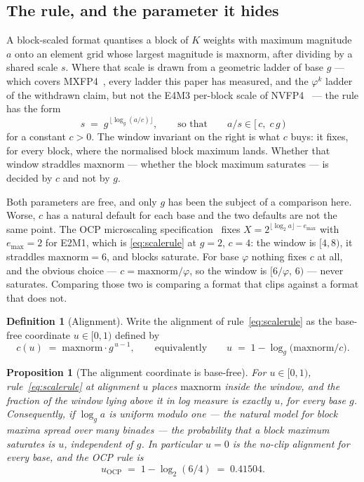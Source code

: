 \documentclass[11pt]{article}
\newtheorem{proposition}[theorem]{Proposition}
\theoremstyle{definition}
\newtheorem{definition}{Definition}
\begin{document}
\subsection{The rule, and the parameter it hides}
\label{sec:twoknobs}

A block-scaled format quantises a block of $K$ weights with maximum magnitude
$a$ onto an element grid whose largest magnitude is $\mathrm{maxnorm}$, after
dividing by a shared scale $s$. Where that scale is drawn from a geometric
ladder of base $g$ --- which covers MXFP4~\cite{ocpmx}, every ladder this paper
has measured, and the $\varphi^{k}$ ladder of the withdrawn claim, but not the
E4M3 per-block scale of NVFP4~\cite{nvfp4} --- the rule has the form
\begin{equation}
  s \;=\; g^{\,\lfloor \log_g (a/c)\rfloor},
  \qquad\text{so that}\qquad
  a/s \in [\,c,\; c\,g\,)
\end{equation}
for a constant $c>0$. The window invariant on the right is what $c$ buys: it
fixes, for every block, where the normalised block maximum lands. Whether that
window straddles $\mathrm{maxnorm}$ --- whether the block maximum saturates ---
is decided by $c$ and not by $g$.

Both parameters are free, and only $g$ has been the subject of a comparison
here. Worse, $c$ has a natural default for each base and the two defaults are
not the same point. The OCP microscaling specification~\cite{ocpmx} fixes
$X = 2^{\lfloor \log_2 a\rfloor - e_{\max}}$ with $e_{\max}=2$ for E2M1, which
is \eqref{eq:scalerule} at $g=2$, $c=4$: the window is $[4,8)$, it straddles
$\mathrm{maxnorm}=6$, and blocks saturate. For base $\varphi$ nothing fixes $c$
at all, and the obvious choice --- $c=\mathrm{maxnorm}/\varphi$, so the window
is $[6/\varphi,\,6)$ --- never saturates. Comparing those two is comparing a
format that clips against a format that does not.

\begin{definition}[Alignment]
\label{def:align}
Write the alignment of rule~\eqref{eq:scalerule} as the base-free coordinate
$u\in[0,1)$ defined by
\[
  c(u) \;=\; \mathrm{maxnorm}\cdot g^{\,u-1},
  \qquad\text{equivalently}\qquad
  u \;=\; 1 - \log_g\!\bigl(\mathrm{maxnorm}/c\bigr).
\]
\end{definition}

\begin{proposition}[The alignment coordinate is base-free]
\label{prop:align}
For $u\in[0,1)$, rule~\eqref{eq:scalerule} at alignment $u$ places
$\mathrm{maxnorm}$ inside the window, and the fraction of the window lying above
it in log measure is exactly $u$, for every base $g$. Consequently, if
$\log_g a$ is uniform modulo one --- the natural model for block maxima spread
over many binades --- the probability that a block maximum saturates is $u$,
independent of $g$. In particular $u=0$ is the no-clip alignment for every base,
and the OCP rule is
\[
  u_{\mathrm{OCP}} \;=\; 1-\log_2(6/4) \;=\; 0.41504 .
\]
\end{proposition}
\end{document}
